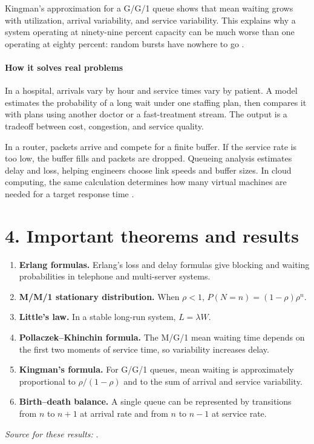 Kingman's approximation for a G/G/1 queue shows that mean waiting grows with utilization, arrival variability, and service variability. This explains why a system operating at ninety-nine percent capacity can be much worse than one operating at eighty percent: random bursts have nowhere to go \cite{queue_ref4,queue_ref5}.

\paragraph{How it solves real problems}
In a hospital, arrivals vary by hour and service times vary by patient. A model estimates the probability of a long wait under one staffing plan, then compares it with plans using another doctor or a fast-treatment stream. The output is a tradeoff between cost, congestion, and service quality.

In a router, packets arrive and compete for a finite buffer. If the service rate is too low, the buffer fills and packets are dropped. Queueing analysis estimates delay and loss, helping engineers choose link speeds and buffer sizes. In cloud computing, the same calculation determines how many virtual machines are needed for a target response time \cite{queue_ref2}.

\section*{4. Important theorems and results}
\begin{enumerate}[leftmargin=*,itemsep=0.35em]
\item \textbf{Erlang formulas.} Erlang's loss and delay formulas give blocking and waiting probabilities in telephone and multi-server systems.

\item \textbf{M/M/1 stationary distribution.} When $\rho<1$, $P(N=n)=(1-\rho)\rho^n$.

\item \textbf{Little's law.} In a stable long-run system, $L=\lambda W$.

\item \textbf{Pollaczek--Khinchin formula.} The M/G/1 mean waiting time depends on the first two moments of service time, so variability increases delay.

\item \textbf{Kingman's formula.} For G/G/1 queues, mean waiting is approximately proportional to $\rho/(1-\rho)$ and to the sum of arrival and service variability.

\item \textbf{Birth--death balance.} A single queue can be represented by transitions from $n$ to $n+1$ at arrival rate and from $n$ to $n-1$ at service rate.
\end{enumerate}
\noindent\emph{Source for these results:} \cite{queue_ref1}.

